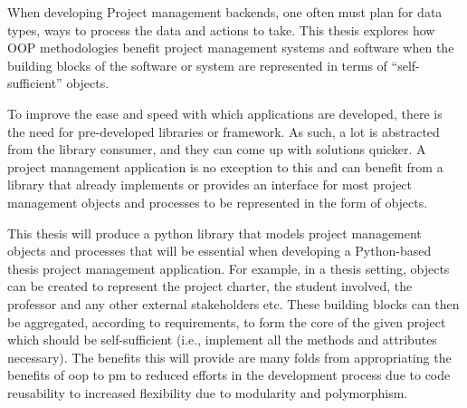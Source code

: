 \thispagestyle{plain}

When developing Project management backends, one often must plan for data types, ways to process the data and actions to take. This thesis explores how OOP methodologies benefit project management systems and software when the building blocks of the software or system are represented in terms of “self-sufficient” objects.

To improve the ease and speed with which applications are developed, there is the need for pre-developed libraries or framework. As such, a lot is abstracted from the library consumer, and they can come up with solutions quicker. A project management application is no exception to this and can benefit from a library that already implements or provides an interface for most project management objects and processes to be represented in the form of objects.

This thesis will produce a python library that models project management objects and processes that will be essential when developing a Python-based thesis project management application. For example, in a thesis setting, objects can be created to represent the project charter, the student involved, the professor and any other external stakeholders etc. These building blocks can then be aggregated, according to requirements, to form the core of the given project which should be self-sufficient (i.e., implement all the methods and attributes necessary). The benefits this will provide are many folds from appropriating the benefits of \acs{oop} to \acs{pm} to reduced efforts in the development process due to code reusability to increased flexibility due to modularity and polymorphism.